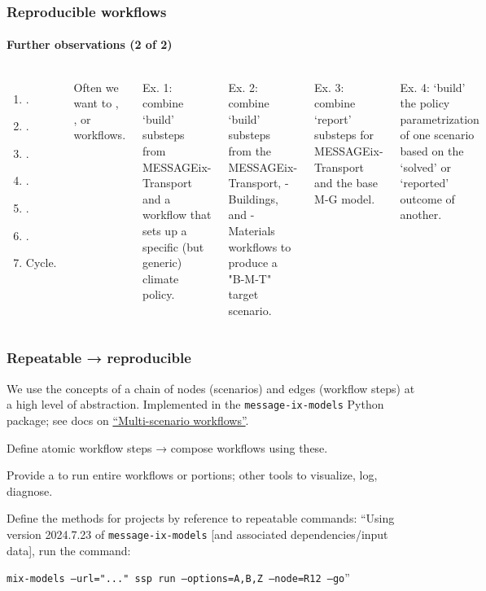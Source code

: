 \documentclass[12pt,aspectratio=169]{beamer}
\begin{document}
\begin{frame}
\frametitle{Reproducible workflows}
\framesubtitle{Further observations (2 of 2)}

\begin{columns}[T]
\begin{enumerate}
  \item {}.
  \item {}.
  \item {}.
  \item {}.
  \item {}.
  \item {}.
  \item Cycle.
\end{enumerate}

Often we want to , , or  workflows.

\smallskip
Ex. 1: combine ‘build’ substeps from MESSAGEix-Transport and a workflow that sets up a specific (but generic) climate policy.

\smallskip
Ex. 2: combine ‘build’ substeps from the MESSAGEix-Transport, -Buildings, and -Materials workflows to produce a "B-M-T" target scenario.

\smallskip
Ex. 3: combine ‘report’ substeps for MESSAGEix-Transport and the base M-G model.

\smallskip
Ex. 4: ‘build’ the policy parametrization of one scenario based on the ‘solved’ or ‘reported’ outcome of another.
\end{columns}
\end{frame}

\begin{frame}
\frametitle{Repeatable → reproducible}

We use the concepts of a chain of nodes (scenarios) and edges (workflow steps) at a high level of abstraction.
Implemented in the \texttt{message-ix-models} Python package; see docs on \href{https://docs.messageix.org/projects/models/en/latest/api/workflow.html}{“Multi-scenario workflows”}.

\bigskip
Define atomic workflow steps → compose workflows using these.

\bigskip
Provide a  to run entire workflows or portions; other tools to visualize, log, diagnose.

\bigskip
Define the methods for projects by reference to repeatable commands: “Using version 2024.7.23 of \texttt{message-ix-models} [and associated dependencies/input data], run the command:

\texttt{mix-models --url="..." ssp run --options=A,B,Z --node=R12 --go}”
\end{frame}
\end{document}
